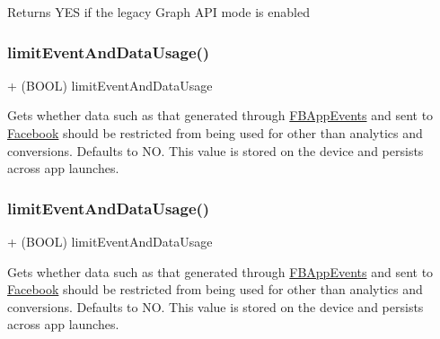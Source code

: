 Returns Y\+ES if the legacy Graph A\+PI mode is enabled \mbox{\label{interfaceFBSettings_a3a939ba08bcff55d53c8e42f9a9e0234}} 
\subsubsection{\texorpdfstring{limit\+Event\+And\+Data\+Usage()}{limitEventAndDataUsage()}\hspace{0.1cm}{\footnotesize\ttfamily [1/5]}}
{\footnotesize\ttfamily + (B\+O\+OL) limit\+Event\+And\+Data\+Usage \begin{DoxyParamCaption}{ }\end{DoxyParamCaption}}

Gets whether data such as that generated through \hyperlink{interfaceFBAppEvents}{F\+B\+App\+Events} and sent to \hyperlink{interfaceFacebook}{Facebook} should be restricted from being used for other than analytics and conversions. Defaults to NO. This value is stored on the device and persists across app launches. \mbox{\label{interfaceFBSettings_a3a939ba08bcff55d53c8e42f9a9e0234}} 
\subsubsection{\texorpdfstring{limit\+Event\+And\+Data\+Usage()}{limitEventAndDataUsage()}\hspace{0.1cm}{\footnotesize\ttfamily [2/5]}}
{\footnotesize\ttfamily + (B\+O\+OL) limit\+Event\+And\+Data\+Usage \begin{DoxyParamCaption}{ }\end{DoxyParamCaption}}

Gets whether data such as that generated through \hyperlink{interfaceFBAppEvents}{F\+B\+App\+Events} and sent to \hyperlink{interfaceFacebook}{Facebook} should be restricted from being used for other than analytics and conversions. Defaults to NO. This value is stored on the device and persists across app launches. \mbox{\label{interfaceFBSettings_a3a939ba08bcff55d53c8e42f9a9e0234}} 

